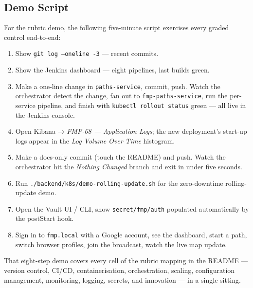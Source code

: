 \documentclass[11pt,a4paper]{article}
\begin{document}
\subsection{Demo Script}
For the rubric demo, the following five-minute script exercises
every graded control end-to-end:

\begin{enumerate}[leftmargin=*]
  \item Show \texttt{git log --oneline -3} — recent commits.
  \item Show the Jenkins dashboard — eight pipelines, last builds
        green.
  \item Make a one-line change in \texttt{paths-service}, commit,
        push.  Watch the orchestrator detect the change, fan out
        to \texttt{fmp-paths-service}, run the per-service
        pipeline, and finish with
        \texttt{kubectl rollout status} green — all live in the
        Jenkins console.
  \item Open Kibana → \emph{FMP-68 — Application Logs}; the new
        deployment's start-up logs appear in the \emph{Log Volume
        Over Time} histogram.
  \item Make a docs-only commit (touch the README) and push.
        Watch the orchestrator hit the \emph{Nothing Changed}
        branch and exit in under five seconds.
  \item Run \texttt{./backend/k8s/demo-rolling-update.sh} for the
        zero-downtime rolling-update demo.
  \item Open the Vault UI / CLI, show
        \texttt{secret/fmp/auth} populated automatically by the
        postStart hook.
  \item Sign in to \texttt{fmp.local} with a Google account, see
        the dashboard, start a path, switch browser profiles, join
        the broadcast, watch the live map update.
\end{enumerate}

That eight-step demo covers every cell of the rubric mapping in
the README — version control, CI/CD, containerisation,
orchestration, scaling, configuration management, monitoring,
logging, secrets, and innovation — in a single sitting.
\end{document}
